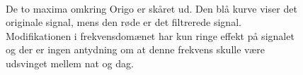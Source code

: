 \documentclass[a4paper, 10pt, danish, final]{article}
\begin{document}
\begin{figure}[!h]
    \centering
    \hspace{1em}
    \\
    \caption[]{De to maxima omkring Origo er skåret ud. Den blå kurve
    viser det originale signal, mens den røde er det filtrerede signal.
    Modifikationen i frekvensdomænet har kun ringe effekt på signalet og
    der er ingen antydning om at denne frekvens skulle være udsvinget
    mellem nat og dag.}
    \label{temp_cut}
\end{figure}
\end{document}
